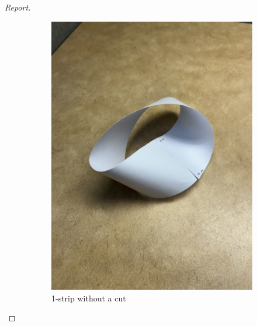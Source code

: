 \documentclass{article}
\begin{document}
\begin{proof}[Report]
    \begin{figure}[htp]
        \centering
        \begin{subfigure}[b]{0.45\textwidth}
            \includegraphics[width=\textwidth]{1twist.jpg}
            \caption{1-strip without a cut}
            \label{fig:fig1}
        \end{subfigure}
        \hfill
        \begin{subfigure}[b]{0.45\textwidth}

\end{subfigure}
\end{figure}
\end{proof}
\end{document}
